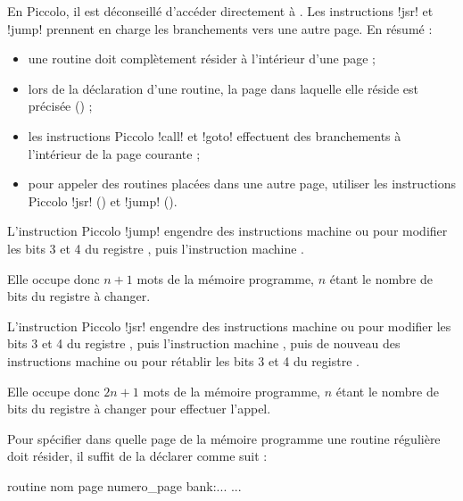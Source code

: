 En Piccolo, il est déconseillé d'accéder directement à . Les instructions \pic!jsr! et \pic!jump! prennent en charge les branchements vers une autre page. En résumé :
\begin{itemize}
  \item une routine doit complètement résider à l'intérieur d'une page ;
  \item lors de la déclaration d'une routine, la page dans laquelle elle réside est précisée () ;
  \item les instructions Piccolo \pic!call! et \pic!goto! effectuent des branchements à l'intérieur de la page courante ;
  \item pour appeler des routines placées dans une autre page, utiliser les instructions Piccolo \pic!jsr! () et \pic!jump! ().
\end{itemize}




L'instruction Piccolo \pic!jump! engendre des instructions machine  ou  pour modifier les bits 3 et 4 du registre , puis l'instruction machine .

Elle occupe donc $n+1$ mots de la mémoire programme, $n$ étant le nombre de bits du registre  à changer.





L'instruction Piccolo  \pic!jsr! engendre des instructions machine  ou  pour modifier les bits 3 et 4 du registre , puis l'instruction machine , puis de nouveau des instructions machine  ou  pour rétablir les bits 3 et 4 du registre .

Elle occupe donc $2n+1$ mots de la mémoire programme, $n$ étant le nombre de bits du registre  à changer pour effectuer l'appel.


Pour spécifier dans quelle page de la mémoire programme une routine régulière doit résider, il suffit de la déclarer comme suit :
\begin{piccolo}
  routine nom page numero_page bank:... {
    ...
  }
\end{piccolo}

